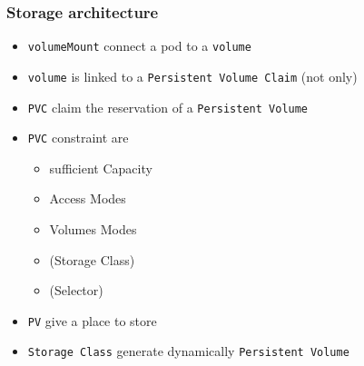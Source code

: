 \subsubsection{Storage architecture}
\begin{frame}[fragile]{\subsubsecname}
  \begin{itemize}
    \item \texttt{volumeMount} connect a pod to a \texttt{volume}
    \item \texttt{volume} is linked to a \texttt{Persistent Volume Claim} (not only)
    \item \texttt{PVC} claim the reservation of a \texttt{Persistent Volume}
    \item \texttt{PVC} constraint are
    \begin{itemize}
      \item sufficient Capacity
      \item Access Modes
      \item Volumes Modes
      \item (Storage Class)
      \item (Selector)
    \end{itemize}
    \item \texttt{PV} give a place to store
    \item \texttt{Storage Class} generate dynamically \texttt{Persistent Volume}
  \end{itemize}
\end{frame}

